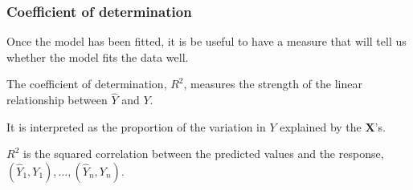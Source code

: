 \documentclass{beamer}
\begin{document}
% 

\begin{frame}
\frametitle{Coefficient of determination}
\bi
\item Once the model has been fitted, it is be useful to have a measure that will tell us whether the model fits the data well.
\item The \alert{coefficient of determination}, $R^2$, measures the strength of the linear relationship between $\hat{Y}$ and $Y$.  
\item It is interpreted as the \alert{proportion of the variation} in $Y$ explained by the $\mathbf{X}$'s.
\item $R^2$ is the squared correlation between the predicted values and the response, $(\hat{Y}_1,Y_1),\ldots,(\hat{Y}_n,Y_n)$.
\ei
\end{frame}
\end{document}

